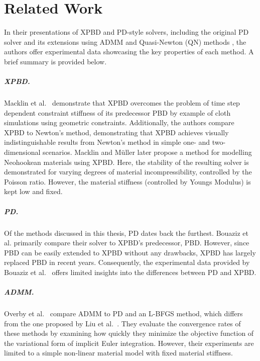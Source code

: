 \chapter{Related Work}\label{ch:related-work}
In their presentations of XPBD \cite{macklin2016} and PD-style solvers, including the original PD solver \cite{bouaziz2014} and its 
extensions using ADMM \cite{overby2017} and Quasi-Newton (QN) methods \cite{liu2017}, the authors offer experimental data showcasing 
the key properties of each method. A brief summary is provided below.

\paragraph{XPBD.}
Macklin et al.\ \cite{macklin2016} demonstrate that XPBD overcomes the problem of time step dependent constraint stiffness of its 
predecessor PBD \cite{mueller2006} by example of cloth simulations using geometric constraints. Additionally, the authors compare 
XPBD to Newton's method, demonstrating that XPBD achieves visually indistinguishable results from Newton's method in simple one- 
and two-dimensional scenarios. Macklin and Müller \cite{macklin2021} later propose a method for modelling Neohookean materials using 
XPBD. Here, the stability of the resulting solver is demonstrated for varying degrees of material incompressibility, controlled by 
the Poisson ratio. However, the material stiffness (controlled by Youngs Modulus) is kept low and fixed.

\paragraph{PD.}
Of the methods discussed in this thesis, PD dates back the furthest. Bouaziz et al. \cite{bouaziz2014} primarily compare their solver 
to XPBD's predecessor, PBD. However, since PBD can be easily extended to XPBD without any drawbacks, XPBD has largely replaced PBD 
in recent years. Consequently, the experimental data provided by Bouaziz et al.\ \cite{bouaziz2014} offers limited insights into the differences 
between PD and XPBD.

\paragraph{ADMM.}
Overby et al.\ \cite{overby2017} compare ADMM to PD and an L-BFGS method, which differs from the one proposed by Liu et al.\ 
\cite{liu2017}. They evaluate the convergence rates of these methods by examining how quickly they minimize the objective function of 
the variational form of implicit Euler integration. However, their experiments are limited to a simple non-linear material model 
with fixed material stiffness.

